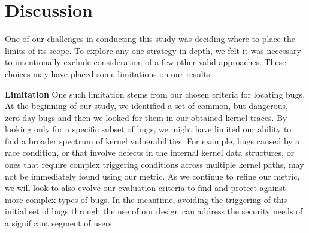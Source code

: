 \section{Discussion} 
\label{sec.limitation}

One of our challenges in conducting this study was deciding where to place the
limits of its scope.  To explore any one strategy
in depth, we felt it was necessary to intentionally exclude consideration of
a few other valid approaches. These choices may have placed some limitations on our results.

\textbf{Limitation }
One such limitation stems from our chosen criteria for locating
bugs. At the beginning
of our study, we identified a set of common, but dangerous, zero-day bugs
and then we looked for them in our obtained kernel traces. By looking only
for a specific subset of bugs, we might have limited our
ability to find a broader spectrum of kernel vulnerabilities. For example, bugs
caused by a race condition, or that involve defects in the internal kernel data
structures, or ones that require complex triggering conditions across multiple kernel
paths, may not be immediately found using our metric. As we continue to refine
our metric, we will look to also evolve our evaluation
criteria to find and protect against more complex types of bugs.
In the meantime, avoiding the triggering of this initial set of bugs
through the use of our \lip design can address the security
needs of a significant segment of users.


